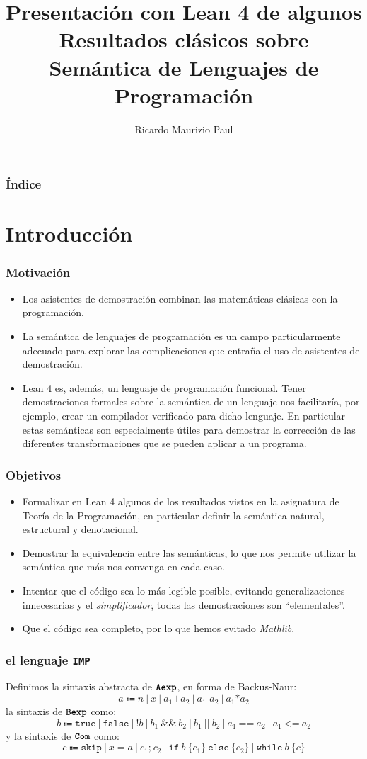 \documentclass[9pt]{beamer}
\title{Presentación con Lean 4 de algunos Resultados clásicos sobre
      Semántica de Lenguajes de Programación}
\author{Ricardo Maurizio Paul}
\newcommand{\tyfont}[1]{\texttt{\textbf{#1}}}
\newcommand{\ImpIfElse}[3]{\texttt{if} \ {#1} \ \{{#2}\} \ \texttt{else} \ \{{#3}\}}
\newcommand{\ImpWhile}[2]{\texttt{while} \ {#1} \ \{{#2}\}}
\newcommand{\ImpConcat}[2]{{#1} \texttt{;} \ {#2}}
\newcommand{\ImpSkip}{\texttt{skip}}
\newcommand{\ImpAssign}[2]{{#1} = {#2}}
\newcommand{\ImpPlus}{\mathbin{\texttt{+}}}
\newcommand{\ImpMinus}{\mathbin{\texttt{-}}}
\newcommand{\ImpTimes}{\mathbin{\texttt{*}}}
\newcommand{\ImpNot}{\texttt{!}}
\newcommand{\ImpAnd}{\mathbin{\texttt{\&\&}}}
\newcommand{\ImpOr}{\mathbin{\texttt{||}}}
\newcommand{\ImpEq}{\mathbin{\texttt{==}}}
\newcommand{\ImpLe}{\mathbin{\texttt{<=}}}
\newcommand{\ImpTrue}{\texttt{true}}
\newcommand{\ImpFalse}{\texttt{false}}
\newcommand{\ImpName}{\texttt{IMP}}
\begin{document}
\frame{\titlepage}

\begin{frame}
\frametitle{Índice}
\tableofcontents
\end{frame}

\section{Introducción}
\begin{frame}
\frametitle{Motivación}
\begin{itemize}
  \item Los asistentes de demostración combinan las matemáticas clásicas con la programación.
  \item La semántica de lenguajes de programación es un campo particularmente adecuado
    para explorar las complicaciones que entraña el uso de asistentes de demostración.
  \item Lean 4 es, además, un lenguaje de programación funcional. Tener demostraciones formales
    sobre la semántica de un lenguaje nos facilitaría, por ejemplo, crear
    un compilador verificado para dicho lenguaje. En particular estas semánticas son
    especialmente útiles para demostrar la corrección de las diferentes transformaciones
    que se pueden aplicar a un programa.
\end{itemize}

\end{frame}

\begin{frame}
\frametitle{Objetivos}
\begin{itemize}
  \item Formalizar en Lean 4 algunos de los resultados vistos en la asignatura de Teoría de la Programación,
    en particular definir la semántica natural, estructural y denotacional.
  \item Demostrar la equivalencia entre las semánticas, lo que nos permite
    utilizar la semántica que más nos convenga en cada caso.
  \item Intentar que el código sea lo más legible posible, evitando generalizaciones
    innecesarias y el \emph{simplificador}, todas las demostraciones son \enquote{elementales}. 
  \item Que el código sea completo, por lo que hemos evitado \emph{Mathlib}.
\end{itemize}

\end{frame}

\begin{frame}
\frametitle{el lenguaje \ImpName{}}
Definimos la sintaxis abstracta de \(\tyfont{Aexp}\), en forma de Backus-Naur:
\[
a \Coloneqq n \ | \ x \ | \ a_1 \ImpPlus a_2 \ | \ a_1 \ImpMinus a_2 \ | \ a_1 \ImpTimes a_2
\]
la sintaxis de \(\tyfont{Bexp}\) como:
\[
b \Coloneqq \ImpTrue \ | \ \ImpFalse \ | \ 
  \ImpNot b \ | \ b_1 \ \ImpAnd \ b_2 \ | \ b_1 \ \ImpOr \ b_2 \ | \ a_1 \ \ImpEq \ a_2 \ | \ a_1 \ \ImpLe \ a_2
\]
y la sintaxis de \(\tyfont{Com}\) como:
\[
c \Coloneqq \ImpSkip \ | \ \ImpAssign{x}{a} \ | \ \ImpConcat{c_1}{c_2} \ | \ \ImpIfElse{b}{c_1}{c_2} \ | \ \ImpWhile{b}{c}
\]
\end{frame}
\end{document}
